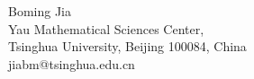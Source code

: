 \documentclass[12pt]{extarticle}
\theoremstyle{plain}
\theoremstyle{definition}
\theoremstyle{remark}
\begin{document}
\begingroup
\sloppy
\setlength{\emergencystretch}{3em}
\raggedright


\endgroup

\bigskip
\noindent Boming Jia \\Yau Mathematical Sciences Center,\\ Tsinghua University, Beijing 100084, China\\
jiabm@tsinghua.edu.cn
\end{document}

